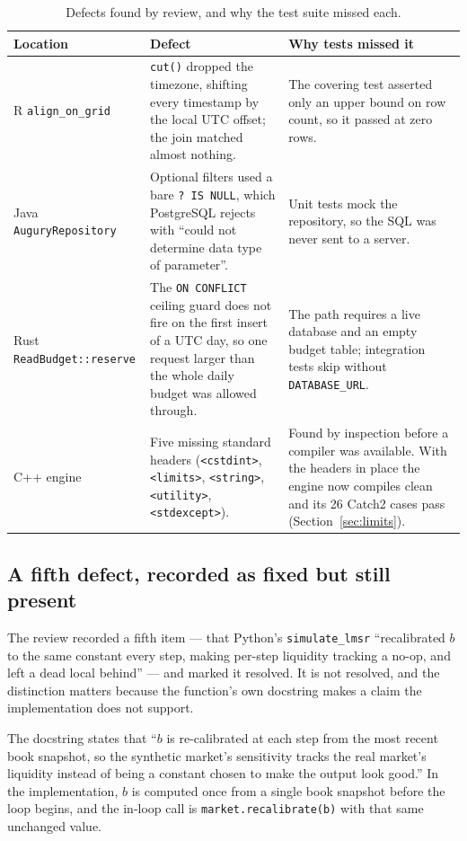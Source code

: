 \documentclass[11pt]{article}
\newcommand{\code}[1]{\texttt{\small #1}}
\begin{document}
\begin{table}[htbp]
\centering
\caption[Defects found by review]{Defects found by review, and why the test suite missed each.}
\label{tab:defects}
\small
\begin{tabular}{@{}p{}p{}p{}@{}}
\toprule
Location & Defect & Why tests missed it \\
\midrule
R \code{align\_on\_grid} &
\code{cut()} dropped the timezone, shifting every timestamp by the local UTC
offset; the join matched almost nothing. &
The covering test asserted only an upper bound on row count, so it passed at
zero rows. \\[2pt]
Java \code{AuguryRepository} &
Optional filters used a bare \code{? IS NULL}, which PostgreSQL rejects with
``could not determine data type of parameter''. &
Unit tests mock the repository, so the SQL was never sent to a server. \\[2pt]
Rust \code{ReadBudget::}\allowbreak\code{reserve} &
The \code{ON CONFLICT} ceiling guard does not fire on the first insert of a UTC
day, so one request larger than the whole daily budget was allowed through. &
The path requires a live database and an empty budget table; integration tests
skip without \code{DATABASE\_URL}. \\[2pt]
C++ engine &
Five missing standard headers (\code{<cstdint>}, \code{<limits>},
\code{<string>}, \code{<utility>}, \code{<stdexcept>}). &
Found by inspection before a compiler was available. With the headers in place the
engine now compiles clean and its 26 Catch2 cases pass
(Section~\ref{sec:limits}). \\
\bottomrule
\end{tabular}
\end{table}

\subsection{A fifth defect, recorded as fixed but still present}

The review recorded a fifth item --- that Python's \code{simulate\_lmsr}
``recalibrated $b$ to the same constant every step, making per-step liquidity
tracking a no-op, and left a dead local behind'' --- and marked it resolved. It
is not resolved, and the distinction matters because the function's own
docstring makes a claim the implementation does not support.

The docstring states that ``$b$ is re-calibrated at each step from the most
recent book snapshot, so the synthetic market's sensitivity tracks the real
market's liquidity instead of being a constant chosen to make the output look
good.'' In the implementation, $b$ is computed once from a single book snapshot
before the loop begins, and the in-loop call is \code{market.recalibrate(b)}
with that same unchanged value.
\end{document}
